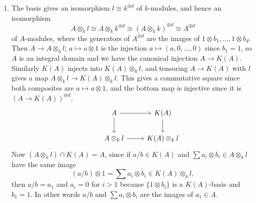 \documentclass{report}
\begin{document}
\begin{enumerate}[label=\textbf{5.4.\Alph*.}]
	\item The basis gives an isomorphism $l\cong k^{\oplus d}$ of $k$-modules,
	      and hence an isomorphism
	      \begin{equation*}
		      A\otimes_kl
		      \cong A\otimes_kk^{\oplus d}
		      \cong (A\otimes_kk)^{\oplus d}
		      \cong A^{\oplus d}
	      \end{equation*}
	      of $A$-modules, where the generators of $A^{\oplus d}$ are the images of
	      $1\otimes b_1,\ldots,1\otimes b_d$. Then $A\to A\otimes_kl$;
	      $a\mapsto a\otimes1$ is the injection $a\mapsto(a,0,\ldots,0)$ since
	      $b_1=1$, so $A$ is an integral domain and we have the canonical
	      injection $A\to K(A)$. Similarly $K(A)$ injects into $K(A)\otimes_kl$,
	      and tensoring $A\to K(A)$ with $l$ gives a map
	      $A\otimes_kl\to K(A)\otimes_kl$. This gives a commutative square since
	      both composites are $a\mapsto a\otimes1$, and the bottom map is
	      injective since it is $(A\to K(A))^{\oplus d}$.
	      \begin{equation*}
		      \begin{tikzcd}
			      &A \arrow{r} \arrow{d}
			      &K(A) \arrow{d} \\
			      &A\otimes_kl \arrow{r}
			      &K(A)\otimes_kl
		      \end{tikzcd}
	      \end{equation*}
	      Now $(A\otimes_kl)\cap K(A)=A$, since if $a/b\in K(A)$ and
	      $\sum a_i\otimes b_i\in A\otimes_kl$ have the same image
	      \begin{equation*}
		      (a/b)\otimes1 = \sum a_i\otimes b_i \in K(A)\otimes_kl,
	      \end{equation*}
	      then $a/b=a_1$ and $a_i=0$ for $i>1$ because $\{1\otimes b_i\}$ is a
	      $K(A)$-basis and $b_1=1$. In other words $a/b$ and $\sum a_i\otimes b_i$
	      are the images of $a_1\in A$.


\end{enumerate}
\end{document}
